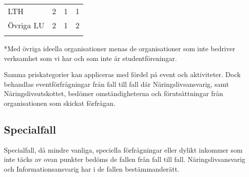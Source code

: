 \documentclass{dsekprotokoll}
\begin{document}
\begin{table}[hbp!]
\begin{tabular}{@{}lccc@{}}
        \addlinespace
        \cmidrule{1-1}
        LTH                                & 2                             & 1                                                                                             & 1                                                                                 \\
        Övriga LU                          & 2                             & 1                                                                                             & 2                                                                                 \\
        \addlinespace
        \bottomrule
    \end{tabular}
\end{table}



*Med övriga ideella organisationer menas de organisationer som inte bedriver verksamhet  som vi har och som inte är studentföreningar.

Samma priskategorier kan appliceras med fördel på event och aktiviteter. Dock behandlas eventförfrågningar från fall till fall där Näringslivsansvarig, samt Näringslivsutskottet, bedömer omständigheterna och förutsättningar från organisationen som  skickat förfrågan.

\subsection{Specialfall}
Specialfall, då mindre vanliga, speciella förfrågningar eller dylikt inkommer som inte täcks av  ovan punkter bedöms de fallen från fall till fall. Näringslivsansvarig och Informationsansvarig har i de fallen bestämmanderätt.
\end{document}
